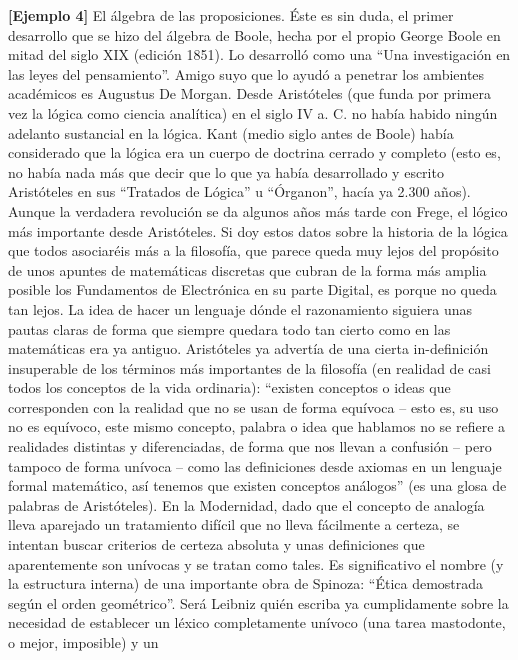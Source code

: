   \textbf{{[}Ejemplo 4{]}} El álgebra de las proposiciones. Éste es sin
  duda, el primer desarrollo que se hizo del álgebra de Boole, hecha por
  el propio George Boole en mitad del siglo XIX (edición 1851). Lo
  desarrolló como una ``Una investigación en las leyes del
  pensamiento''. Amigo suyo que lo ayudó a penetrar los ambientes
  académi\-cos es Augustus De Morgan. Desde Aristóteles (que funda por
  primera vez la ló\-gica como ciencia analítica) en el siglo IV a. C.
  no había habido ningún adelanto sustancial en la lógica. Kant (medio
  siglo antes de Boole) había considerado que la lógica era un cuerpo de
  doctrina cerrado y completo (esto es, no había nada más que decir que
  lo que ya había desarrollado y escrito Aristóteles en sus ``Tra\-tados
  de Lógica'' u ``Órganon'', hacía ya 2.300 años). Aunque la verdadera
  revolu\-ción se da algunos años más tarde con Frege, el lógico más
  importante desde Aristóteles. Si doy estos datos sobre la historia de
  la lógica que todos asociaréis más a la filosofía, que parece queda
  muy lejos del propósito de unos apuntes de matemáticas discretas que
  cubran de la forma más amplia posible los Fundamentos de Electró\-nica
  en su parte Digital, es porque no queda tan lejos. La idea de hacer un
  len\-guaje dónde el razonamiento siguiera unas pautas claras de forma
  que siempre quedara todo tan cierto como en las matemáticas era ya
  antiguo. Aristóteles ya advertía de una cierta in-definición
  insuperable de los términos más importantes de la filosofía (en
  realidad de casi todos los conceptos de la vida ordinaria):
  ``exis\-ten conceptos o ideas que corresponden con la realidad que no
  se usan de forma equívoca -- esto es, su uso no es equívoco, este
  mismo concepto, palabra o idea que hablamos no se refiere a realidades
  distintas y diferenciadas, de forma que nos llevan a confusión -- pero
  tampoco de forma unívoca -- como las definiciones desde axiomas en un
  lenguaje formal matemático, así tenemos que existen con\-ceptos
  análogos'' (es una glosa de palabras de Aristóteles). En la
  Modernidad, dado que el concepto de analogía lleva aparejado un
  tratamiento difícil que no lleva fácilmente a certeza, se intentan
  buscar criterios de certeza absoluta y unas definiciones que
  aparentemente son unívocas y se tratan como tales. Es significativo el
  nombre (y la estructura interna) de una importante obra de Spino\-za:
  ``Ética demostrada según el orden geométrico''. Será Leibniz quién
  escriba ya cumplidamente sobre la necesidad de establecer un léxico
  completamente unívoco (una tarea mastodonte, o mejor, imposible) y un
